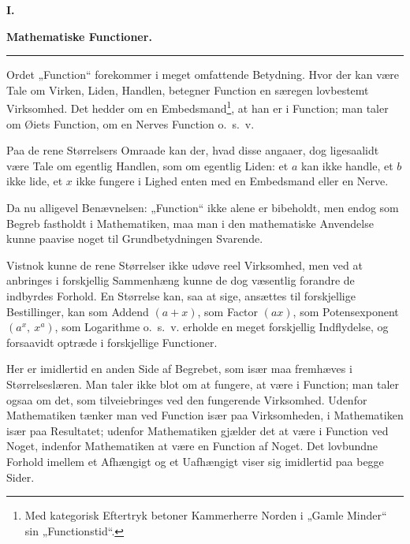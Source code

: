 \documentclass[12pt]{book}
\newcommand{\opage}[1]{\marginnote{\footnotesize\textit{[#1]}}}
\begin{document}
\opage{5} \begin{center}
  {\large\bfseries I.}\par\vspace{4pt}
  {\Large\bfseries Mathematiske Functioner.}\par\vspace{4pt}
  \rule{2.5cm}{0.4pt}
\end{center}
{}

\noindent Ordet „Function“ forekommer i meget omfattende Betydning. Hvor der
kan være Tale om Virken, Liden, Handlen, betegner Function en særegen
lovbestemt Virksomhed. Det hedder om en Embedsmand\footnote{Med kategorisk
Eftertryk betoner Kammerherre Norden i „Gamle Minder“ sin „Functionstid“.}, at
han er i Function; man taler om Øiets Function, om en Nerves Function o.\ s.\ v.

Paa de rene Størrelsers Omraade kan der, hvad disse angaaer, dog ligesaalidt
være Tale om egentlig Handlen, som om egentlig Liden: et $a$ kan ikke handle,
et $b$ ikke lide, et $x$ ikke fungere i Lighed enten med en Embedsmand eller en
Nerve.

Da nu alligevel Benævnelsen: „Function“ ikke alene er bibeholdt, men endog som
Begreb fastholdt i Mathematiken, maa man i den mathematiske Anvendelse kunne
paavise noget til Grundbetydningen Svarende.

Vistnok kunne de rene Størrelser ikke udøve reel Virksomhed, men ved at
anbringes i forskjellig Sammenhæng kunne de dog væsentlig forandre de indbyrdes
Forhold. En Størrelse kan, saa at sige, ansættes til forskjellige Bestillinger,
kan som Addend $(a+x)$, som Factor $(ax)$, som Potensexponent $(a^{x},\ x^{a})$,
som Logarithme o.\ s.\ v. erholde en
\opage{6} meget forskjellig Indflydelse, og forsaavidt optræde i forskjellige Functioner.

Her er imidlertid en anden Side af Begrebet, som især maa fremhæves i
Størrelseslæren. Man taler ikke blot om at fungere, at være i Function; man
taler ogsaa om det, som tilveiebringes ved den fungerende Virksomhed. Udenfor
Mathematiken tænker man ved Function især paa Virksomheden, i Mathematiken især
paa Resultatet; udenfor Mathematiken gjælder det at være i Function ved Noget,
indenfor Mathematiken at være en Function af Noget. Det lovbundne Forhold
imellem et Afhængigt og et Uafhængigt viser sig imidlertid paa begge Sider.
\end{document}
